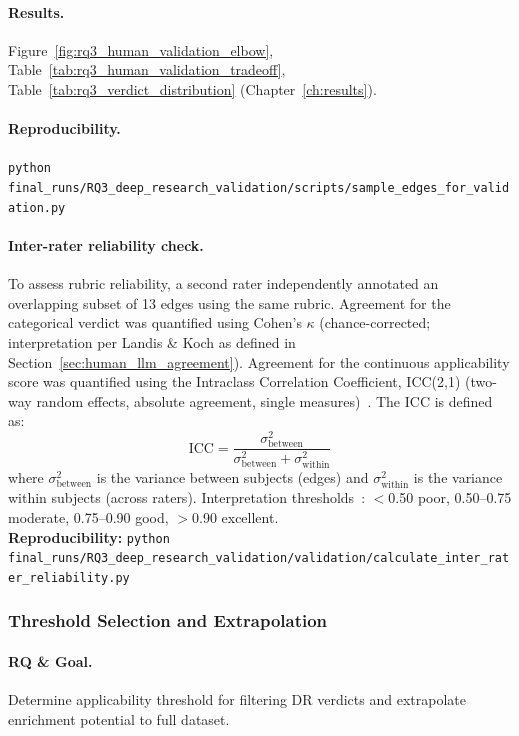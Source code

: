 \paragraph{Results.}
Figure~\ref{fig:rq3_human_validation_elbow}, Table~\ref{tab:rq3_human_validation_tradeoff}, Table~\ref{tab:rq3_verdict_distribution} (Chapter~\ref{ch:results}).

\paragraph{Reproducibility.}
\texttt{python final\_runs/RQ3\_deep\_research\_validation/scripts/sample\_edges\_for\_validation.py}

\paragraph{Inter-rater reliability check.}
To assess rubric reliability, a second rater independently annotated an overlapping subset of 13 edges using the same rubric. Agreement for the categorical verdict was quantified using Cohen's $\kappa$ (chance-corrected; interpretation per Landis \& Koch as defined in Section~\ref{sec:human_llm_agreement}). Agreement for the continuous applicability score was quantified using the Intraclass Correlation Coefficient, ICC(2,1) (two-way random effects, absolute agreement, single measures)~\citep{koo2016guideline}. The ICC is defined as:
\[
\text{ICC} = \frac{\sigma^2_{\text{between}}}{\sigma^2_{\text{between}} + \sigma^2_{\text{within}}}
\]
where $\sigma^2_{\text{between}}$ is the variance between subjects (edges) and $\sigma^2_{\text{within}}$ is the variance within subjects (across raters). Interpretation thresholds~\citep{koo2016guideline}: $<$0.50 poor, 0.50--0.75 moderate, 0.75--0.90 good, $>$0.90 excellent.\\
\textbf{Reproducibility:} \texttt{python final\_runs/RQ3\_deep\_research\_validation/validation/calculate\_inter\_rater\_reliability.py}

\subsubsection{Threshold Selection and Extrapolation}
\label{sec:rq3_threshold_selection}

\paragraph{RQ \& Goal.}
Determine applicability threshold for filtering DR verdicts and extrapolate enrichment potential to full dataset.

